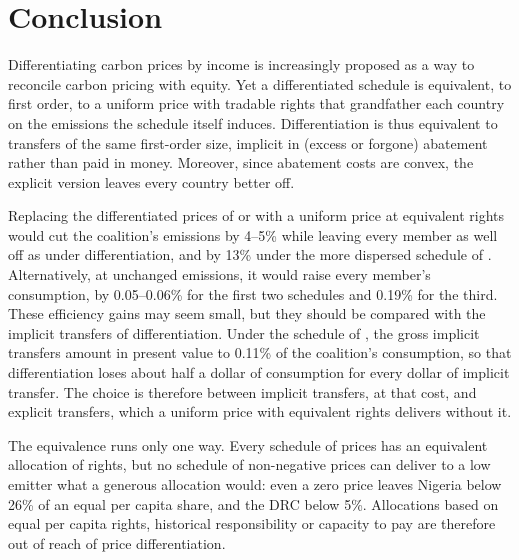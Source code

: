 \documentclass[12pt,english]{article}
\theoremstyle{remark}
\begin{document}
\FloatBarrier

\section{Conclusion}
\label{sec:conclusion}

Differentiating carbon prices by income is increasingly proposed as a way to reconcile carbon pricing with equity.
Yet a differentiated schedule is equivalent, to first order, to a uniform price with tradable rights that grandfather each country on the emissions the schedule itself induces. Differentiation is thus equivalent to transfers of the same first-order size, implicit in (excess or forgone) abatement rather than paid in money.
Moreover, since abatement costs are convex, the explicit version leaves every country better off.

Replacing the differentiated prices of \citet{wolfram_building_2025} or \citet{banerjee_grand_2025} with a uniform price at equivalent rights would cut the coalition's emissions by 4--5\%
while leaving every member as well off as under differentiation, and by 13\% under the more dispersed schedule of \citet{equal_right_climate_2023}. Alternatively, at unchanged emissions, it would raise every member's consumption, by 0.05--0.06\% for the first two schedules and 0.19\% for the third.
These efficiency gains may seem small, but they should be compared with the implicit transfers of differentiation. Under the schedule of \citet{banerjee_grand_2025}, the gross implicit transfers amount in present value to 0.11\% of the coalition's consumption, so that differentiation loses about half a dollar of consumption for every dollar of implicit transfer. The choice is therefore between implicit transfers, at that cost, and explicit transfers, which a uniform price with equivalent rights delivers without it.

The equivalence runs only one way. Every schedule of prices has an equivalent allocation of rights, but no schedule of non-negative prices can deliver to a low emitter what a generous allocation would: even a zero price leaves Nigeria below 26\% of an equal per capita share, and the DRC below 5\%.
Allocations based on equal per capita rights, historical responsibility or capacity to pay are therefore out of reach of price differentiation.
\end{document}
